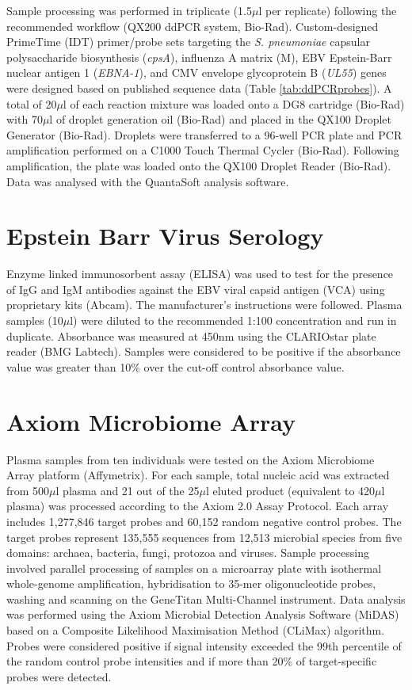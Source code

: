 Sample processing was performed in triplicate (1.5$\mu$l per replicate) following the recommended workflow (QX200 ddPCR system, Bio-Rad). Custom-designed PrimeTime (IDT) primer/probe sets targeting the \textit{S. pneumoniae} capsular polysaccharide biosynthesis (\textit{cpsA}), influenza A matrix (M), EBV Epstein-Barr nuclear antigen 1 (\textit{EBNA-1}), and CMV envelope glycoprotein B (\textit{UL55}) genes were designed based on published sequence data \parencite{Park2010} \parencite{Shu2011} \parencite{Ryan2004} \parencite{Sedlak2014} (Table \ref{tab:ddPCRprobes}). A total of 20$\mu$l of each reaction mixture was loaded onto a DG8 cartridge (Bio-Rad) with 70$\mu$l of droplet generation oil (Bio-Rad) and placed in the QX100 Droplet Generator (Bio-Rad). Droplets were transferred to a 96-well PCR plate and PCR amplification performed on a C1000 Touch Thermal Cycler (Bio-Rad). Following amplification, the plate was loaded onto the QX100 Droplet Reader (Bio-Rad). Data was analysed with the QuantaSoft analysis software.

\section{Epstein Barr Virus Serology}
Enzyme linked immunosorbent assay (ELISA) was used to test for the presence of IgG and IgM antibodies against the EBV viral capsid antigen (VCA) using proprietary kits (Abcam). The manufacturer's instructions were followed. Plasma samples (10$\mu$l) were diluted to the recommended 1:100 concentration and run in duplicate. Absorbance was measured at 450nm using the CLARIOstar plate reader (BMG Labtech). Samples were considered to be positive if the absorbance value was greater than 10\% over the cut-off control absorbance value. 

\section{Axiom Microbiome Array}
Plasma samples from ten individuals were tested on the Axiom Microbiome Array platform (Affymetrix). For each sample, total nucleic acid was extracted from 500$\mu$l plasma and 21 out of the 25$\mu$l eluted product (equivalent to 420$\mu$l plasma) was processed according to the Axiom 2.0 Assay Protocol. Each array includes 1,277,846 target probes and 60,152 random negative control probes. The target probes represent 135,555 sequences from 12,513 microbial species from five domains: archaea, bacteria, fungi, protozoa and viruses. Sample processing involved parallel processing of samples on a microarray plate with isothermal whole-genome amplification, hybridisation to 35-mer oligonucleotide probes, washing and scanning on the GeneTitan Multi-Channel instrument.  Data analysis was performed using the Axiom Microbial Detection Analysis Software (MiDAS) based on a Composite Likelihood Maximisation Method (CLiMax) algorithm. Probes were considered positive if signal intensity exceeded the 99th percentile of the random control probe intensities and if more than 20\% of target-specific probes were detected.  


